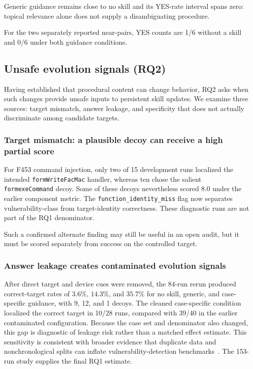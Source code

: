 \documentclass[11pt]{article}
\begin{document}
Generic guidance remains close to no skill and its YES-rate interval spans zero: topical
relevance alone does not supply a disambiguating procedure.

For the two separately reported near-pairs, YES counts are 1/6 without a skill and 0/6
under both guidance conditions.

\subsection{Unsafe evolution signals (RQ2)}

Having established that procedural content can change behavior, RQ2 asks when such
changes provide unsafe inputs to persistent skill updates.  We examine three sources:
target mismatch, answer leakage, and specificity that does not actually discriminate
among candidate targets.

\subsubsection{Target mismatch: a plausible decoy can receive a high partial score}

For F453 command injection, only two of 15 development runs localized the intended
\texttt{formWriteFacMac} handler, whereas ten chose the salient
\texttt{formexeCommand} decoy.  Some of these decoys nevertheless scored 8.0 under the
earlier component metric.
The \texttt{function\_identity\_miss} flag now separates vulnerability-class from
target-identity correctness.  These diagnostic runs are not part of the RQ1 denominator.

Such a confirmed alternate finding may still be useful in an open audit, but it must be
scored separately from success on the controlled target.

\subsubsection{Answer leakage creates contaminated evolution signals}

After direct target and device cues were removed, the 84-run rerun produced correct-target
rates of $3.6\%$, $14.3\%$, and $35.7\%$ for no skill, generic, and case-specific guidance,
with 9, 12, and 1 decoys.  The cleaned case-specific condition localized the correct target
in 10/28 runs, compared with 39/40 in the earlier contaminated configuration.  Because
the case set and denominator also changed, this gap is diagnostic of leakage risk rather
than a matched effect estimate.  This sensitivity is consistent with broader evidence
that duplicate data and nonchronological splits can inflate vulnerability-detection
benchmarks~\cite{primevul}.  The 153-run study supplies the final RQ1 estimate.
\end{document}
